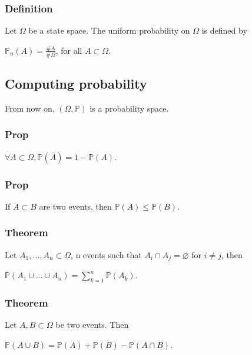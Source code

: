             \subsubsection{Definition}
                Let $\Omega$ be a state space. The uniform probability on $\Omega$ is defined by

                \vspace{5pt}
                
                \centerline{$\mathbb{P}_u(A)=\frac{\#A}{\#\Omega}$, for all $A\subset\Omega$.}

        \subsection{Computing probability}
            From now on, $(\Omega, \mathbb{P})$ is a probability space.

            \subsubsection{Prop}
                $\forall A \subset \Omega, \mathbb{P}(\overline{A})=1-\mathbb{P}(A)$.
                
            \subsubsection{Prop}
            If $A \subset B$ are two events, then $\mathbb{P}(A) \leq \mathbb{P}(B)$.

            \subsubsection{Theorem}
            Let $A_1,...,A_n \subset \Omega$, n events such that $A_i\cap A_j=\varnothing$ for $i\neq j$, then

                \vspace{5pt}

                \centerline{$\mathbb{P}(A_1\cup...\cup A_n)=\displaystyle\sum_{k=1}^n \mathbb{P}(A_k)$.}
                
            \subsubsection{Theorem}
                Let $A,B \subset \Omega$ be two events. Then

                \vspace{5pt}

                \centerline{$\mathbb{P}(A\cup B)=\mathbb{P}(A)+\mathbb{P}(B)-\mathbb{P}(A\cap B)$.}

